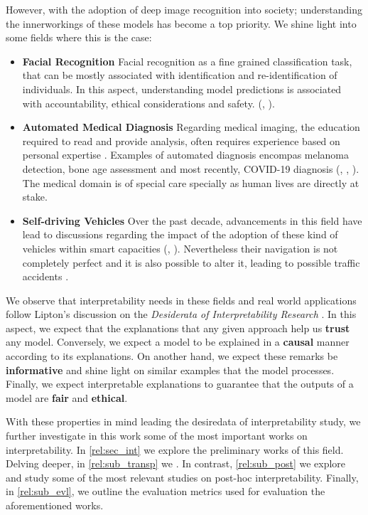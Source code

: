 \noindent However, with the adoption of deep image recognition into society; understanding the 
innerworkings of these models has become a top priority. We shine light into some fields where 
this is the case:
\begin{itemize}
    \item \textbf{Facial Recognition} Facial recognition as a fine grained classification task, 
    that can be mostly associated with identification and re-identification of individuals. 
    In this aspect, understanding model predictions is associated with accountability, ethical 
    considerations and safety.
    (\cite{selinger2020inconsentability}, \cite{andrejevic2020facial}).
    \item \textbf{Automated Medical Diagnosis} Regarding medical imaging, the education 
    required to read and provide analysis, often requires experience based 
    on personal expertise \autocite{nakashima2013visual}. Examples of automated diagnosis encompas 
    melanoma detection, bone age assessment and most recently, COVID-19 diagnosis (\cite{yu2016automated}, 
    \cite{BoNet2019hand}, \cite{huang2021artificial}). The medical domain is of special care 
    specially as human lives are directly at stake.
    \item \textbf{Self-driving Vehicles} Over the past decade, advancements in this field have lead to 
    discussions regarding the impact of the adoption of these kind of vehicles within smart capacities 
    (\cite{duarte2018impact}, \cite{millard2018pedestrians}). Nevertheless their 
    navigation is not completely perfect and it is also possible to alter it, leading to possible 
    traffic accidents \autocite{dixit2016autonomous}.
\end{itemize}

We observe that interpretability needs in these fields and real world applications follow 
Lipton's discussion on the \textit{Desiderata of Interpretability Research} 
\autocite{mythos_interp}. In this aspect, we expect that the explanations that any given 
approach help us \textbf{trust} any model. Conversely, we expect a model to be explained in a 
\textbf{causal} manner according to its explanations. On another hand, 
we expect these remarks be \textbf{informative} and shine light on similar examples that the 
model processes. Finally, we expect interpretable explanations to guarantee that the outputs 
of a model are \textbf{fair} and \textbf{ethical}.

With these properties in mind leading the desiredata of interpretability study, we further 
investigate in this work some of the most important works on interpretability. In 
\autoref{rel:sec_int} we explore the preliminary works of this field. Delving deeper, in 
\autoref{rel:sub_transp} we . In contrast, \autoref{rel:sub_post} we explore and study 
some of the most relevant studies on post-hoc interpretability. Finally, in \autoref{rel:sub_evl}, 
we outline the evaluation metrics used for evaluation the aforementioned works.

\newpage

\newpage
